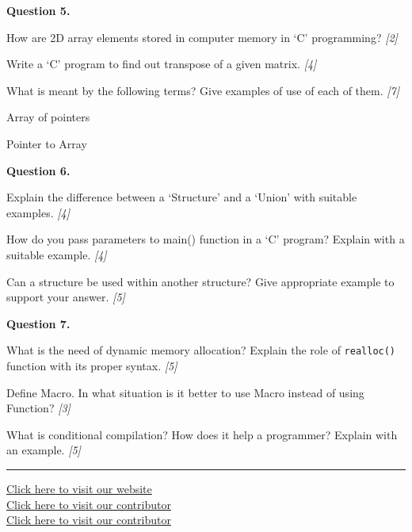 \documentclass[11pt,a4paper]{article}
\newcommand{\pts}[1]{\hfill   \textit{[#1]}}
\begin{document}
\noindent   \textbf{Question 5.}

\begin{parts}
  \item How are 2D array elements stored in computer memory in `C' programming? \pts{2}
  \item Write a `C' program to find out transpose of a given matrix. \pts{4}
  \item What is meant by the following terms? Give examples of use of each of them. \pts{7}
  
\begin{parts}
    \item Array of pointers
    \item Pointer to Array
  \end{parts}
\end{parts}

\medskip


\noindent   \textbf{Question 6.}

\begin{parts}
  \item Explain the difference between a `Structure' and a `Union' with suitable examples. \pts{4}
  \item How do you pass parameters to main() function in a `C' program? Explain with a suitable example. \pts{4}
  \item Can a structure be used within another structure? Give appropriate example to support your answer. \pts{5}
\end{parts}

\medskip


\noindent   \textbf{Question 7.}

\begin{parts}
  \item What is the need of dynamic memory allocation? Explain the role of   \texttt{realloc()} function with its proper syntax. \pts{5}
  \item Define Macro. In what situation is it better to use Macro instead of using Function? \pts{3}
  \item What is conditional compilation? How does it help a programmer? Explain with an example. \pts{5}
\end{parts}

\vfill
\rule{\linewidth}{0.4pt}

\begin{center}\small
\href{https://bhu-exam.vercel.app/}{Click here to visit our website}\\[4pt]\href{https://me-aryan.vercel.app/}{Click here to visit our contributor}\\[4pt]\href{https://quashan-me.vercel.app/}{Click here to visit our contributor}
\end{center}
\end{document}
